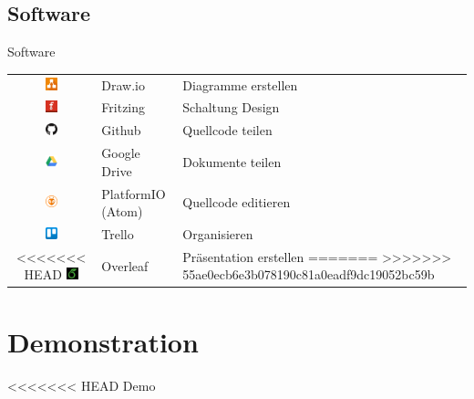 \documentclass[mathserif,9pt]{article}
\begin{document}
    \subsection{Software}
    \begin{frame}{Software}
        \begin{block}{}
            \begin{tabular}{cll}
                \includegraphics[width=3.5mm]{img/drawio.png} & Draw.io & Diagramme erstellen \\
                \includegraphics[width=3.5mm]{img/fritzing.png} & Fritzing & Schaltung Design \\
                \includegraphics[width=3.5mm]{img/github.png} & Github & Quellcode teilen \\
                \includegraphics[width=3.5mm]{img/googledrive.png} & Google Drive & Dokumente teilen \\
                \includegraphics[width=3.5mm]{img/platformio.png} & PlatformIO (Atom) & Quellcode editieren \\
                \includegraphics[width=3.5mm]{img/trello.png} & Trello & Organisieren \\
<<<<<<< HEAD
                \includegraphics[width=3.5mm]{img/overleaf.png} & Overleaf & Präsentation erstellen %
=======
>>>>>>> 55ae0ecb6e3b078190c81a0eadf9dc19052bc59b
            \end{tabular}
        \end{block}
    \end{frame}
    \section{Demonstration}
    \begin{frame}
        \begin{block}{}
            \centering
<<<<<<< HEAD
            {\fontsize{100}{120}\selectfont Demo}
        \end{block}
    \end{frame}
    
\end{document}
